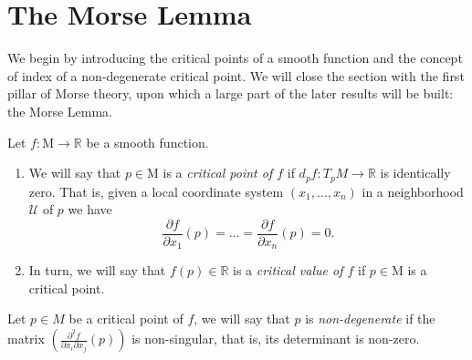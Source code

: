 \bigskip
\section{The Morse Lemma}

We begin by introducing the critical points of a smooth function and the concept of index of a non-degenerate critical point. We will close the section with the first pillar of Morse theory, upon which a large part of the later results will be built: the Morse Lemma.
\medskip
\begin{definition}
    Let $f: $M$ \to \mathbb{R}$ be a smooth function.
    \begin{enumerate}[label=\roman*)]
        \item We will say that $p\in \mathrm{M}$ is a \textit{critical point of $f$} if $d_{p}f:T_{p}M\to \mathbb{R}$ is identically zero. That is, given a local coordinate system $(x_{1}, \dots ,x_{n})$ in a neighborhood $\mathcal{U}$ of $p$ we have
        \begin{equation*}
            \frac{\partial f}{\partial x_1}(p)= \dots = \frac{\partial f}{\partial x_n}(p) = 0.
        \end{equation*}

        \item In turn, we will say that $f(p)\in \mathbb{R}$ is a \textit{critical value of $f$} if $p \in \mathrm{M}$ is a critical point.

    \end{enumerate}
\end{definition}
\bigskip

\begin{definition}
    Let $p\in M$ be a critical point of $f$, we will say that $p$ is \textit{non-degenerate} if the matrix $\left(\frac{\partial^{2}f}{\partial x_i \partial x_j}(p)\right)$ is non-singular, that is, its determinant is non-zero.
\end{definition}
\bigskip

